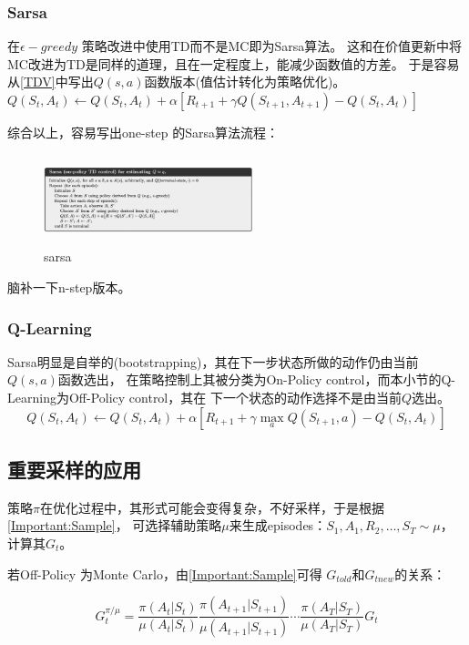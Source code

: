 \documentclass[UTF8]{ctexart}
\begin{document}
\subsubsection{Sarsa}
在$\epsilon-greedy$ 策略改进中使用TD而不是MC即为Sarsa算法。
这和在价值更新中将MC改进为TD是同样的道理，且在一定程度上，能减少函数值的方差。
于是容易从\eqref{TDV}中写出$Q(s,a)$函数版本(值估计转化为策略优化)。
$Q\left(S_{t}, A_{t}\right) \leftarrow Q\left(S_{t}, A_{t}\right)+\alpha\left[R_{t+1}+\gamma Q\left(S_{t+1},
 A_{t+1}\right)-Q\left(S_{t}, A_{t}\right)\right]$

综合以上，容易写出one-step 的Sarsa算法流程：

\begin{figure}[htbp]
	\centering
	\includegraphics[width=6.1cm, height=2.6cm]{./pic/sarsa.png}
	\caption{sarsa}
\end{figure}

脑补一下n-step版本。

\subsubsection{Q-Learning}
Sarsa明显是自举的(bootstrapping)，其在下一步状态所做的动作仍由当前$Q(s,a)$函数选出，
在策略控制上其被分类为On-Policy control，而本小节的Q-Learning为Off-Policy control，其在
下一个状态的动作选择不是由当前$Q$选出。
\begin{equation}\label{qlearning}
    Q\left(S_{t}, A_{t}\right) \leftarrow Q\left(S_{t}, A_{t}\right)+\alpha\left[R_{t+1}+\gamma \max _{a} Q\left(S_{t+1}, a\right)-Q\left(S_{t}, A_{t}\right)\right]
\end{equation}

\subsection{重要采样的应用}
策略$\pi$在优化过程中，其形式可能会变得复杂，不好采样，于是根据\eqref{Important:Sample}，
可选择辅助策略$\mu$来生成episodes：$S_{1}, A_{1}, R_{2}, \dots, S_{T} \sim \mu$，
计算其$G_t$。

若Off-Policy 为Monte Carlo，由\eqref{Important:Sample}可得 $G_{told}$和$G_{tnew}$的关系：

$$G_{t}^{\pi / \mu}=\frac{\pi\left(A_{t} | S_{t}\right)}{\mu\left(A_{t} | S_{t}\right)} \frac{\pi\left(A_{t+1} | S_{t+1}\right)}{\mu\left(A_{t+1} | S_{t+1}\right)} \cdots
 \frac{\pi\left(A_{T} | S_{T}\right)}{\mu\left(A_{T} | S_{T}\right)} G_{t}$$
\end{document}
